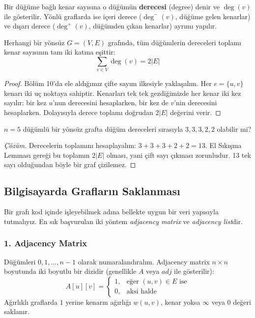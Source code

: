 Bir düğüme bağlı kenar sayısına o düğümün \textbf{derecesi} (degree) denir ve $\deg(v)$ ile gösterilir. Yönlü graflarda ise içeri derece ($\deg^-(v)$, düğüme gelen kenarlar) ve dışarı derece ($\deg^+(v)$, düğümden çıkan kenarlar) ayrımı yapılır.

\begin{theorem}
Herhangi bir yönsüz $G=(V, E)$ grafında, tüm düğümlerin dereceleri toplamı kenar sayısının tam iki katına eşittir:
\[
\sum_{v \in V} \deg(v) = 2|E|
\]
\end{theorem}

\begin{proof}
Bölüm 10'da ele aldığımız çifte sayım ilkesiyle yaklaşalım. Her $e = \{u, v\}$ kenarı iki uç noktaya sahiptir. Kenarları tek tek gezdiğimizde her kenar iki kez sayılır: bir kez $u$'nun derecesini hesaplarken, bir kez de $v$'nin derecesini hesaplarken. Dolayısıyla derece toplamı doğrudan $2|E|$ değerini verir.
\end{proof}

\begin{example}
$n=5$ düğümlü bir yönsüz grafta düğüm dereceleri sırasıyla $3, 3, 3, 2, 2$ olabilir mi?

\begin{proof}[Çözüm]
Derecelerin toplamını hesaplayalım: $3 + 3 + 3 + 2 + 2 = 13$.
El Sıkışma Lemması gereği bu toplamın $2|E|$ olması, yani çift sayı çıkması zorunludur. 13 tek sayı olduğundan böyle bir graf çizilemez.
\end{proof}
\end{example}

\subsection{Bilgisayarda Grafların Saklanması}
Bir grafı kod içinde işleyebilmek adına bellekte uygun bir veri yapısıyla tutmalıyız. En sık başvurulan iki yöntem \emph{adjacency matrix} ve \emph{adjacency list}dir.

\subsubsection{1. Adjacency Matrix}
Düğümleri $0, 1, \dots, n-1$ olarak numaralandıralım. Adjacency matrix $n \times n$ boyutunda iki boyutlu bir dizidir (genellikle $A$ veya $adj$ ile gösterilir):
\[
A[u][v] = \begin{cases} 
1, & \text{eğer } (u, v) \in E \text{ ise} \\
0, & \text{aksi halde}
\end{cases}
\]
Ağırlıklı graflarda $1$ yerine kenarın ağırlığı $w(u, v)$, kenar yoksa $\infty$ veya $0$ değeri saklanır.

